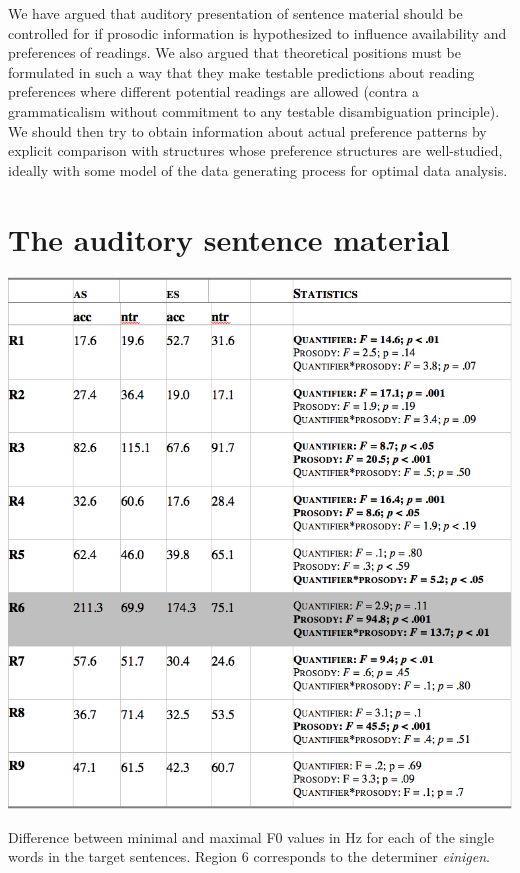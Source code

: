 \documentclass[fleqn,reqno,10pt]{article}
\begin{document}
We have argued that auditory presentation of sentence material should
be controlled for if prosodic information is hypothesized to influence
availability and preferences of readings. We also argued that
theoretical positions must be formulated in such a way that they make
testable predictions about reading preferences where different
potential readings are allowed (contra a grammaticalism without
commitment to any testable disambiguation principle). We should then
try to obtain information about actual preference patterns by explicit
comparison with structures whose preference structures are
well-studied, ideally with some model of the data generating process
for optimal data analysis.

\newpage

\appendix

\section{The auditory sentence material}
\label{sec:audit-sent-mater}


\begin{table}[!hp]
  \centering
  
  \includegraphics[width=\textwidth]{pictures/Acoustics/Table-B.png}

  \caption{Difference between minimal and maximal F0 values in Hz for
    each of the single words in the target sentences. Region 6
    corresponds to the determiner \emph{einigen}.} 
  \label{tab:table-B}
\end{table}
\end{document}
